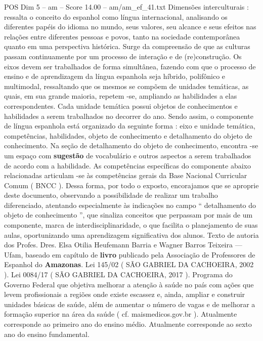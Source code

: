 \begin{textsample}{POS Dim 5 – am – Score 14.00 – am/am\_ef\_41.txt}
Dimensões interculturais : ressalta o conceito do espanhol como língua internacional, analisando os diferentes papéis do idioma no mundo, seus valores, seu alcance e seus efeitos nas relações entre diferentes pessoas e povos, tanto na sociedade contemporânea quanto em uma perspectiva histórica.
Surge da compreensão de que as culturas passam continuamente por um processo de interação e de (re)construção.
Os eixos devem ser trabalhados de forma simultânea, fazendo com que o processo de ensino e de aprendizagem da língua espanhola seja híbrido, polifônico e multimodal, ressaltando que os mesmos se compõem de unidades temáticas, as quais, em sua grande maioria, repetem -se, ampliando as habilidades a elas correspondentes.
Cada unidade temática possui objetos de conhecimentos e habilidades a serem trabalhados no decorrer do ano.
Sendo assim, o componente de língua espanhola está organizado da seguinte forma : eixo e unidade temática, competências, habilidades, objeto de conhecimento e detalhamento do objeto de conhecimento.
Na seção de detalhamento do objeto de conhecimento, encontra -se um espaço com \textbf{sugestão} de vocabulário e outros aspectos a serem trabalhados de acordo com a habilidade.
As competências específicas do componente abaixo relacionadas articulam -se às competências gerais da Base Nacional Curricular Comum ( BNCC ).
Dessa forma, por todo o exposto, encorajamos que se aproprie deste documento, observando a possibilidade de realizar um trabalho diferenciado, atentando especialmente às indicações no campo “ detalhamento do objeto de conhecimento ”, que sinaliza conceitos que perpassam por mais de um componente, marca de interdisciplinaridade, o que facilita o planejamento de suas aulas, oportunizando uma aprendizagem significativa dos alunos.
Texto de autoria dos Profes.
Dres.
Elsa Otilia Heufemann Barria e Wagner Barros Teixeira — Ufam, baseado em capítulo de \textbf{livro} publicado pela Associação de Professores de Espanhol do \textbf{Amazonas}.
Lei 145/02 ( SÃO GABRIEL DA CACHOEIRA, 2002 ).
Lei 0084/17 ( SÃO GABRIEL DA CACHOEIRA, 2017 ).
Programa do Governo Federal que objetiva melhorar a atenção à saúde no país com ações que levem profissionais a regiões onde existe escassez e, ainda, ampliar e construir unidades básicas de saúde, além de aumentar o número de vagas e de melhorar a formação superior na área da saúde ( cf. maismedicos.gov.br ).
Atualmente corresponde ao primeiro ano do ensino médio.
Atualmente corresponde ao sexto ano do ensino fundamental.

\end{textsample}
